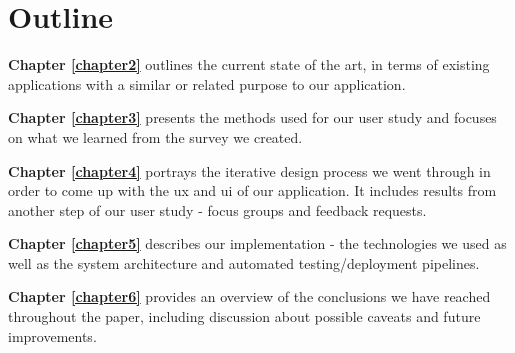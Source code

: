 \section{Outline} \label{1:outline}
    \textbf{Chapter \ref{chapter2}} outlines the current state of the art, in terms of existing applications with a similar or related purpose to our application.
    
    \textbf{Chapter \ref{chapter3}} presents the methods used for our user study and focuses on what we learned from the survey we created.
    
    \textbf{Chapter \ref{chapter4}} portrays the iterative design process we went through in order to come up with the \acrshort{ux} and \acrshort{ui} of our application. It includes results from another step of our user study - focus groups and feedback requests.
    
    \textbf{Chapter \ref{chapter5}} describes our implementation - the technologies we used as well as the system architecture and automated testing/deployment pipelines.
    
    \textbf{Chapter \ref{chapter6}} provides an overview of the conclusions we have reached throughout the paper, including discussion about possible caveats and future improvements.